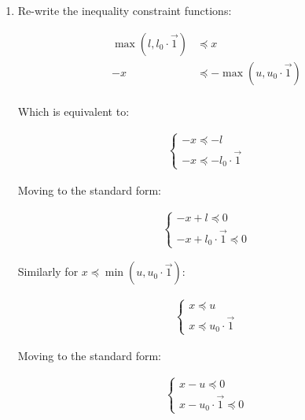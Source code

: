\documentclass[11pt, letterpaper, titlepage]{article}
\begin{document}
\begin{enumerate}
    
    \item %
    
    Re-write the inequality constraint functions:
    
    \begin{equation*}
        \begin{aligned}
            \max (l, l_0 \cdot \Vec{1}) &\preceq x \\
            - x &\preceq - \max (u, u_0 \cdot \Vec{1}) \\
        \end{aligned}
    \end{equation*}
    
    Which is equivalent to:
    
    \begin{gather*}
        \begin{cases}
            -x \preceq - l \\
            -x \preceq - l_0 \cdot \Vec{1}
        \end{cases}
    \end{gather*}
    
    Moving to the standard form:
    
    \begin{gather*}
        \begin{cases}
            -x + l \preceq 0 \\
            -x + l_0 \cdot \Vec{1} \preceq 0
        \end{cases}
    \end{gather*}
    
    Similarly for $x \preceq \min (u, u_0 \cdot \Vec{1})$:
    
    \begin{gather*}
        \begin{cases}
            x \preceq u \\
            x \preceq u_0 \cdot \Vec{1}
        \end{cases}
    \end{gather*}
    
    Moving to the standard form:
    
    \begin{gather*}
        \begin{cases}
            x - u \preceq 0 \\
            x - u_0 \cdot \Vec{1} \preceq 0
        \end{cases}
    \end{gather*}
    

\end{enumerate}
\end{document}
